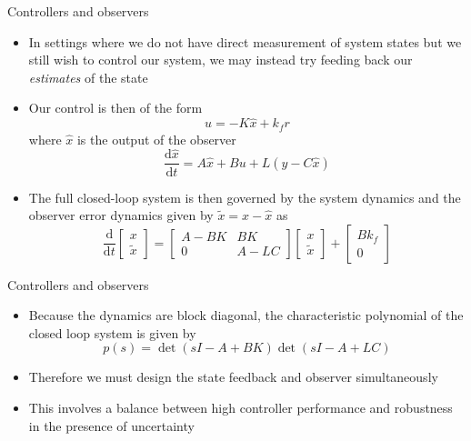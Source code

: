 \documentclass{beamer-control}
\begin{document}
\begin{frame}{Controllers and observers}
\begin{itemize}
	\item In settings where we do not have direct measurement of system states but we still wish to control our system, we may instead try feeding back our \textit{estimates} of the state
	\item Our control is then of the form 
	\[u=-K\hat{x}+k_f r\]
	where $\hat{x}$ is the output of the observer
	\[\frac{\mathrm{d}\hat{x}}{\mathrm{d}t} = A\hat{x}+Bu+L(y-C\hat{x})\]
	\item The full closed-loop system is then governed by the system dynamics and the observer error dynamics given by $\tilde{x}=x-\hat{x}$ as
	\[\frac{\mathrm{d}}{\mathrm{d}t} \begin{bmatrix}
		x \\ \tilde{x}
	\end{bmatrix} = \begin{bmatrix}
	A-BK & BK\\
	0 & A-LC 
	\end{bmatrix} \begin{bmatrix}
	x \\ \tilde{x}
	\end{bmatrix}  + \begin{bmatrix}
	Bk_f \\ 0
	\end{bmatrix} \]
\end{itemize}
	
\end{frame}

\begin{frame}{Controllers and observers}
\begin{itemize}
	\item Because the dynamics are block diagonal, the characteristic polynomial of the closed loop system is given by 
	\[p(s) = \operatorname{det}(sI-A+BK)\operatorname{det}(sI-A+LC)\]
	\item Therefore we must design the state feedback and observer simultaneously
	\item This involves a balance between high controller performance and robustness in the presence of uncertainty
\end{itemize}
\end{frame}


\SUMMARYFRAME
\FINALE
\end{document}
